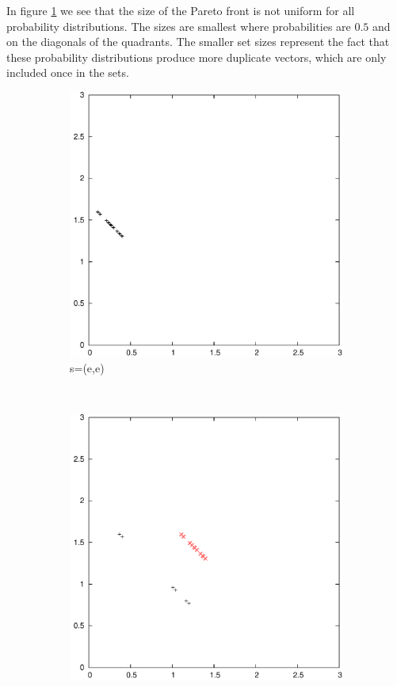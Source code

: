 \documentclass{article}
\begin{document}
	In figure \ref{fig:t2s0} we see that the size of the Pareto front is not
	uniform for all probability distributions. The sizes are smallest where
	probabilities are $0.5$ and on the diagonals of the quadrants. The
	smaller set sizes represent the fact that these probability distributions
	produce more duplicate vectors, which are only included once in the sets.
	\begin{figure}
		\centering
		\begin{subfigure}[b]{0.3\textwidth}
			\centering
			\includegraphics[width=\textwidth]{images/t2s0}
			\caption{s=(e,e)}
			\label{fig:t2s0}
		\end{subfigure}
		~
		\begin{subfigure}[b]{0.3\textwidth}
			\centering
			\includegraphics[width=\textwidth]{images/t2s1}

\end{subfigure}
\end{figure}
\end{document}
